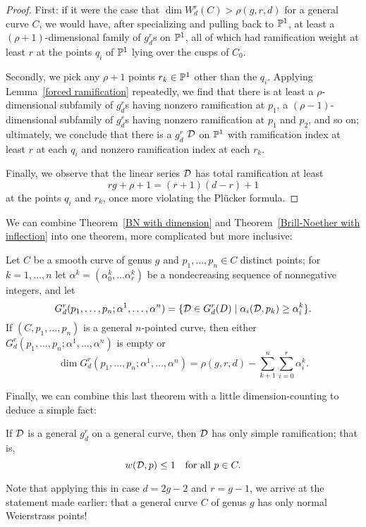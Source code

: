 \begin{proof}
First: if it were the case that $\dim W^r_d(C) > \rho(g,r,d)$ for a general curve $C$, we would have, after specializing and pulling back to ${\mathbb P}^1$, at least a $(\rho + 1)$-dimensional family of $g^r_d$s on ${\mathbb P}^1$, all of which had ramification weight at least $r$ at the points $q_i$ of ${\mathbb P}^1$ lying over the cusps of $C_0$. 

Secondly, we pick any $\rho + 1$ points $r_k \in {\mathbb P}^1$ other than the $q_i$. Applying Lemma~\ref{forced ramification} repeatedly, we find that there is at least a $\rho$-dimensional subfamily of $g^r_d$s having nonzero ramification at $p_1$, a $(\rho - 1)$-dimensional subfamily of $g^r_d$s having nonzero ramification at $p_1$ and $p_2$, and so on; ultimately, we conclude that there is a $g^r_d$ ${\mathcal D}$ on ${\mathbb P}^1$ with ramification index at least $r$ at each $q_i$ and nonzero ramification index at each $r_k$. 

Finally, we observe that the linear series ${\mathcal D}$ has total ramification at least
$$
rg + \rho + 1 = (r+1)(d-r)+1
$$
at the points $q_i$ and $r_k$, once more violating the Pl\"ucker formula.
\end{proof}

We can combine Theorem~\ref{BN with dimension} and Theorem~\ref{Brill-Noether with inflection} into one theorem, more complicated but more inclusive:

\begin{theorem}\label{BN with inflection and dimension}
Let $C$ be a smooth curve of genus $g$ and $p_1,\dots,p_n \in C$ distinct points; for $k = 1,\dots,n$ let $\alpha^k = (\alpha^k_0,\dots\alpha^k_r)$ be a nondecreasing sequence of nonnegative integers, and let
$$
G^r_d(p_1,\dots,p_n; \alpha^1,\dots,\alpha^n) = \{{\mathcal D} \in G^r_d(D) \mid \alpha_i({\mathcal D}, p_k) \geq \alpha^k_i \}.
$$
If $(C, p_1,\dots,p_n)$ is a general $n$-pointed curve, then either $G^r_d(p_1,\dots,p_n; \alpha^1,\dots,\alpha^n)$ is empty or
$$
\dim G^r_d(p_1,\dots,p_n; \alpha^1,\dots,\alpha^n) = \rho(g,r,d) - \sum_{k+1}^n \sum_{i=0}^r \alpha^k_i.
$$
\end{theorem}

Finally, we can combine this last theorem with a little dimension-counting to deduce a simple fact:

\begin{theorem}
If ${\mathcal D}$ is a general $g^r_d$ on a general curve, then ${\mathcal D}$ has only simple ramification; that is,
$$
w({\mathcal D}, p) \leq 1 \quad \text{for all } p \in C.
$$
\end{theorem}

Note that applying this in case $d=2g-2$ and $r = g-1$, we arrive at the statement made earlier: that a general curve $C$ of genus $g$ has only normal Weierstrass points!


